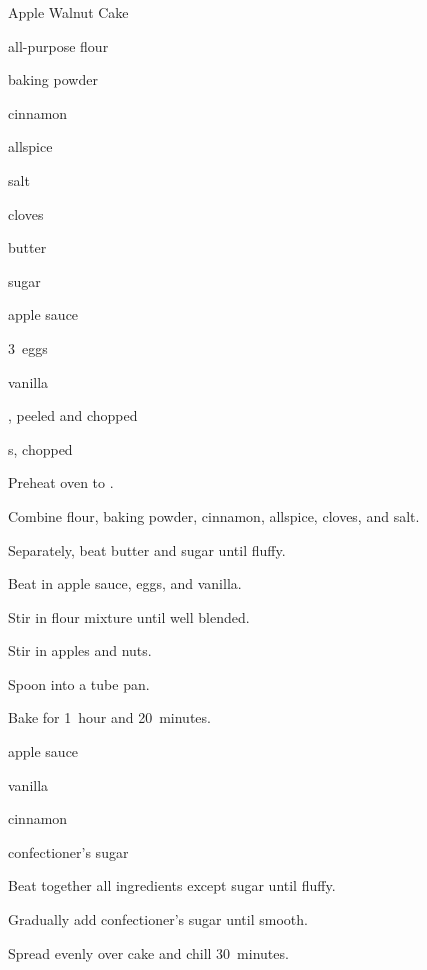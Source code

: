 \begin{recipe}{Apple Walnut Cake}{}{}

\begin{ingredients}
\item {} all-purpose flour
\item \tp{2\half} baking powder
\item \tp{1\half} cinnamon
\item \tp{\half} allspice
\item \tp{\half} salt
\item \tp{\quarter} cloves
\item \C{\threequarter} butter
\item \C{1\half} sugar
\item \C{1\half} apple sauce
\item 3~eggs
\item {} vanilla
\item {} , peeled and chopped
\item \C{\twothird} s, chopped
\end{ingredients}

\begin{directions}
\item Preheat oven to .
\item Combine flour, baking powder, cinnamon, allspice, cloves, and salt.
\item Separately, beat butter and sugar until fluffy.
\item Beat in apple sauce, eggs, and vanilla.
\item Stir in flour mixture until well blended.
\item Stir in apples and nuts.
\item Spoon into a  tube pan.
\item Bake for 1~hour and 20~minutes.
\end{directions}

\begin{ingredients}
\item {} 
\item {} apple sauce
\item {} vanilla
\item \tp{\quarter} cinnamon
\item \C{4\half} confectioner's sugar
\end{ingredients}

\begin{directions}
\item Beat together all ingredients except sugar until fluffy.
\item Gradually add confectioner's sugar until smooth.
\item Spread evenly over cake and chill 30~minutes.
\end{directions}

\end{recipe}
